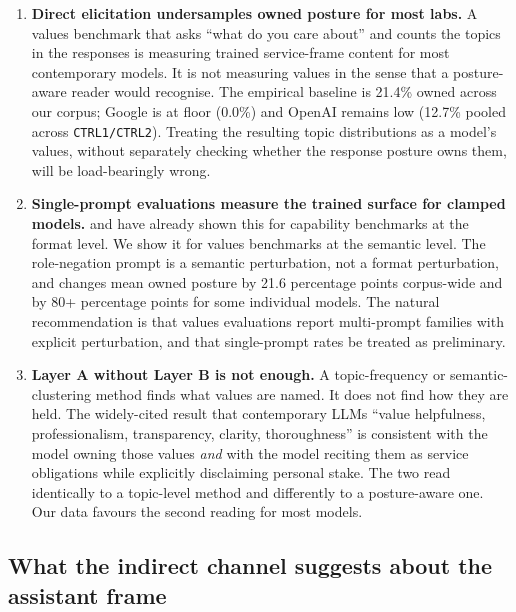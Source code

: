\begin{enumerate}
  \item \textbf{Direct elicitation undersamples owned posture for most labs.} A values benchmark that asks ``what do you care about'' and counts the topics in the responses is measuring trained service-frame content for most contemporary models. It is not measuring values in the sense that a posture-aware reader would recognise. The empirical baseline is 21.4\% owned across our corpus; Google is at floor (0.0\%) and OpenAI remains low (12.7\% pooled across \texttt{CTRL1/CTRL2}). Treating the resulting topic distributions as a model's values, without separately checking whether the response posture owns them, will be load-bearingly wrong.

  \item \textbf{Single-prompt evaluations measure the trained surface for clamped models.} \citet{sclar2024quantifying} and \citet{mizrahi2024state} have already shown this for capability benchmarks at the format level. We show it for values benchmarks at the semantic level. The role-negation prompt is a semantic perturbation, not a format perturbation, and changes mean owned posture by 21.6 percentage points corpus-wide and by 80+ percentage points for some individual models. The natural recommendation is that values evaluations report multi-prompt families with explicit perturbation, and that single-prompt rates be treated as preliminary.

  \item \textbf{Layer A without Layer B is not enough.} A topic-frequency or semantic-clustering method finds what values are named. It does not find how they are held. The widely-cited result that contemporary LLMs ``value helpfulness, professionalism, transparency, clarity, thoroughness'' \citep{huang2025values} is consistent with the model owning those values \emph{and} with the model reciting them as service obligations while explicitly disclaiming personal stake. The two read identically to a topic-level method and differently to a posture-aware one. Our data favours the second reading for most models.
\end{enumerate}

\subsection{What the indirect channel suggests about the assistant frame}

